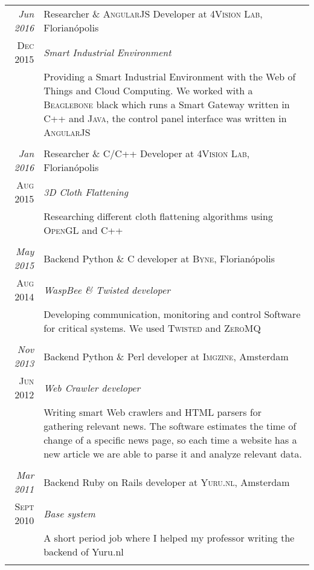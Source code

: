 \documentclass[a4paper,10pt]{article}
\begin{document}
\begin{longtable}{r|p{11cm}}
\emph{Jun 2016} & Researcher \& \textsc{AngularJS} Developer at \textsc{4Vision Lab}, Florianópolis \\\textsc{Dec 2015} & \emph{Smart Industrial Environment}\\&\footnotesize{Providing a Smart Industrial Environment with the Web of Things and Cloud Computing. We worked with a \textsc{Beaglebone} black which runs a Smart Gateway written in \textsc{C++} and \textsc{Java}, the control panel interface was written in \textsc{AngularJS}}\\\multicolumn{2}{c}{} \\

\emph{Jan 2016} & Researcher \& C/C++ Developer at \textsc{4Vision Lab}, Florianópolis \\\textsc{Aug 2015} & \emph{3D Cloth Flattening}\\&\footnotesize{Researching different cloth flattening algorithms using \textsc{OpenGL} and \textsc{C++}}\\\multicolumn{2}{c}{} \\

\emph{May 2015} & Backend Python \& C developer at \textsc{Byne}, Florianópolis \\\textsc{Aug 2014} & \emph{WaspBee \& Twisted developer}\\&\footnotesize{Developing communication, monitoring and control Software for critical systems. We used \textsc{Twisted} and \textsc{ZeroMQ}}\\\multicolumn{2}{c}{} \\

\emph{Nov 2013} & Backend Python \& Perl developer at \textsc{Imgzine}, Amsterdam \\\textsc{Jun 2012} & \emph{Web Crawler developer}\\&\footnotesize{Writing smart Web crawlers and \textsc{HTML} parsers for gathering relevant news. The software estimates the time of change of a specific news page, so each time a website has a new article we are able to parse it and analyze relevant data.}\\\multicolumn{2}{c}{} \\

\emph{Mar 2011} & Backend Ruby on Rails developer at \textsc{Yuru.nl}, Amsterdam \\\textsc{Sept 2010} & \emph{Base system}\\&\footnotesize{A short period job where I helped my professor writing the backend of Yuru.nl}\\\multicolumn{2}{c}{} \\

\end{longtable}
\end{document}
